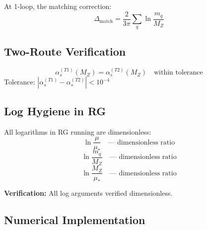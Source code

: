 \documentclass[11pt,a4paper]{article}
\theoremstyle{definition}
\begin{document}
At 1-loop, the matching correction:
\begin{equation}
\label{eq:t2-match}
\Delta_{\text{match}} = \frac{2}{3\pi} \sum_q \ln\frac{m_q}{M_Z}
\end{equation}

\subsection{Two-Route Verification}
\label{subsec:two-route-verify}

\begin{predictionbox}
\begin{equation}
\label{eq:t1-t2-match}
\boxed{\alpha_s^{(T1)}(M_Z) = \alpha_s^{(T2)}(M_Z) \quad \text{within tolerance}}
\end{equation}
Tolerance: $|\alpha_s^{(T1)} - \alpha_s^{(T2)}| < 10^{-4}$
\end{predictionbox}

\subsection{Log Hygiene in RG}
\label{subsec:log-hygiene-rg}

All logarithms in RG running are dimensionless:
\begin{equation}
\label{eq:log-dimless-1}
\ln\frac{\mu}{\mu_*} \quad \text{--- dimensionless ratio}
\end{equation}
\begin{equation}
\label{eq:log-dimless-2}
\ln\frac{m_q}{M_Z} \quad \text{--- dimensionless ratio}
\end{equation}
\begin{equation}
\label{eq:log-dimless-3}
\ln\frac{M_Z}{\mu_*} \quad \text{--- dimensionless ratio}
\end{equation}

\textbf{Verification:} All log arguments verified dimensionless.

\subsection{Numerical Implementation}
\label{subsec:numerical-impl}
\end{document}
